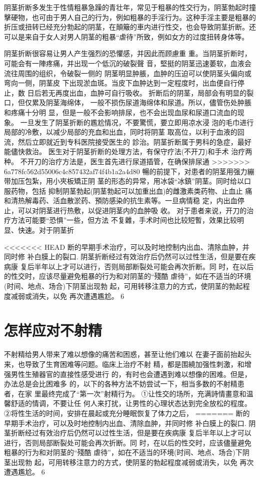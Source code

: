 \documentclass[12pt,UTF8]{ctexbook}
\begin{document}
阴茎折断多发生于性情粗暴急躁的青壮年，常见于粗暴的性交行为，阴茎勃起时撞擊硬物，也可由于男人自己的行为，例如粗暴的手淫行为。这种手淫主要是粗暴的折压或扭转已经充分勃起的阴茎，在顛簸的車内进行性交，也会导致阴茎折断。还可以是来自于女人对男人阴茎的粗暴“虐待”所致，例如女方的过度扭转身体等。

阴茎折断很容易让男人产生强烈的恐懼感，并因此而顾慮重
重。当阴茎折断时，可能会有一陣疼痛，并出现一个低沉的破裂聲
音，堅挺的阴茎迅速萎软，血液会流往周围的组织，令破裂一侧的
阴茎明显肿脹，血肿的压迫可以使阴茎头偏向或弯向一侧，阴茎皮
下出现淤血斑。当皮下血肿达到一定程度时，出血便自行停止，数
日后若无再度出血，血肿可自行吸收。
折断后的阴茎，局部会有明显的裂口，但仅累及阴茎海绵体，
一般不损伤尿道海绵体和尿道。所以，儘管伤处肿脹和疼痛十分明
显，但是一般不会影响排尿，也不会出现血尿和尿道口流血的现
象。
一旦发生了阴茎折断的尷尬情况，不要驚慌，要立即用凉水浸
泡的毛巾进行局部的冷敷，以减少局部的充血和出血，同时将阴茎
取高位，以利于血液的回流，然后立即就近到专科医院接受医生的
診治。阴茎折断属于男科的急症，最好能儘快救治。
医生对于阴茎折断的处理方法，有保守疗法(不开刀)和手术
治疗两种。
不开刀的治疗方法是，医生首先进行尿道插管，在确保排尿通
>>>>>>> 6a778fc562d55006c4c857432af74f4b1a2a4d80
暢的前提下，对患者的阴茎用强力繃带加压包紮，用小夾板矯正阴
茎的形态的异常，用冰袋“冰鎮”阴茎。同时给以口服药物，包括
抑制阴茎勃起(阴茎勃起可以加重出血)的雌激素类药物、止血止
痛和清热解毒药、活血散淤药、預防感染的抗生素等。一旦病情稳
定，内出血停止，可以对阴茎进行热敷，以促进阴茎内的血肿吸
收。
对于患者来说，开刀的治疗方法可能要“恐惧”一些，但方法
不复雜，手术时间也比较短暫，效果比较明显、快速。对于阴茎折

<<<<<<< HEAD
断的早期手术治疗，可以及时地控制内出血、清除血肿，并同时修
补白膜上的裂口.
阴茎折断经过有效治疗后仍然可以过性生活，但是要在疾病康
复后半年以上才可以进行，否则局部断裂处可能会再次折断。同
时，在以后的性交时，应该尽量避免粗暴的行为和对阴茎的“殘酷
虐待”，如在不适当的环境(时间、地点、场合)下阴茎出现勃
起，可用转移注意力的方式，使阴茎的勃起程度减弱或消失，以免
再次遭遇尷尬。
6
\section{怎样应对不射精}
不射精给男人带来了难以想像的痛苦和困惑，甚至让他们难以
在妻子面前抬起头来，也导致了生育困难等问题。临床上治疗不射
精，都是围繞加强性刺激，和增强男性生殖器官的直接性感受进行
的，有时也会遭遇到难以想像的困难。但是，办法总是会比困难多
的，以下的各种方法不妨尝试一下，相当多数的不射精患者，在家
里最终完成了“第一次”射精行为。
①让性交的场所，充满詩情畫意和温馨舒适的情调，不要让任
何人来打扰，让男性的心理状态达到完全放松的程度。
②将性生活的时间，安排在晨起或充分睡眠恢复了体力之后，
=======
断的早期手术治疗，可以及时地控制内出血、清除血肿，并同时修
补白膜上的裂口.
阴茎折断经过有效治疗后仍然可以过性生活，但是要在疾病康
复后半年以上才可以进行，否则局部断裂处可能会再次折断。同
时，在以后的性交时，应该儘量避免粗暴的行为和对阴茎的“殘酷
虐待”，如在不适当的环境(时间、地点、场合)下阴茎出现勃
起，可用转移注意力的方式，使阴茎的勃起程度减弱或消失，以免
再次遭遇尷尬。
6
\end{document}
